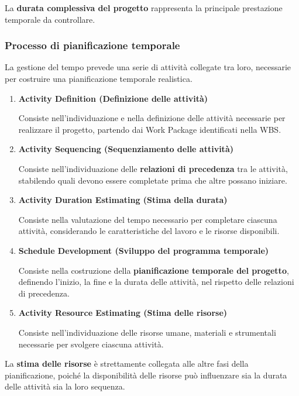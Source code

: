 \medskip

\noindent La \textbf{durata complessiva del progetto} rappresenta la principale prestazione temporale da controllare.

\subsubsection*{Processo di pianificazione temporale}

\noindent La gestione del tempo prevede una serie di attività collegate tra loro, necessarie per costruire una pianificazione temporale realistica.

\begin{enumerate}
    \item \textbf{Activity Definition (Definizione delle attività)}

    Consiste nell'individuazione e nella definizione delle attività necessarie per realizzare il progetto, partendo dai Work Package identificati nella WBS.

    \item \textbf{Activity Sequencing (Sequenziamento delle attività)}

    Consiste nell'individuazione delle \textbf{relazioni di precedenza} tra le attività, stabilendo quali devono essere completate prima che altre possano iniziare.

    \item \textbf{Activity Duration Estimating (Stima della durata)}

    Consiste nella valutazione del tempo necessario per completare ciascuna attività, considerando le caratteristiche del lavoro e le risorse disponibili.

    \item \textbf{Schedule Development (Sviluppo del programma temporale)}

    Consiste nella costruzione della \textbf{pianificazione temporale del progetto}, definendo l'inizio, la fine e la durata delle attività, 
    nel rispetto delle relazioni di precedenza.

    \item \textbf{Activity Resource Estimating (Stima delle risorse)}

    Consiste nell'individuazione delle risorse umane, materiali e strumentali necessarie per svolgere ciascuna attività.
\end{enumerate}

\noindent La \textbf{stima delle risorse} è strettamente collegata alle altre fasi della pianificazione, poiché la 
disponibilità delle risorse può influenzare sia la durata delle attività sia la loro sequenza.

